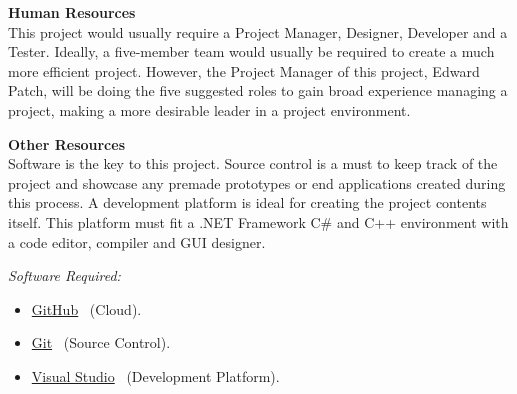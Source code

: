 \documentclass[conference]{IEEEtran}
\begin{document}
        \textbf{Human Resources}\\
          This project would usually require a Project Manager, Designer, Developer and a Tester. Ideally, a five-member team would usually be required to create a much more efficient project. However, the Project Manager of this project, Edward Patch, will be doing the five suggested roles to gain broad experience managing a project, making a more desirable leader in a project environment. 

        \textbf{Other Resources}\\
        Software is the key to this project. Source control is a must to keep track of the project and showcase any premade prototypes or end applications created during this process. A development platform is ideal for creating the project contents itself. This platform must fit a .NET Framework C\# and C++ environment with a code editor, compiler and GUI designer. 

        \textit{Software Required:}
        \begin{itemize}
          \item \href{https://github.com/}{GitHub}~\cite{github_github_nodate} (Cloud).
          \item \href{https://git-scm.com/}{Git}~\cite{git_git_nodate} (Source Control).
          \item \href{https://visualstudio.microsoft.com/}{Visual Studio}~\cite{microsoft_visual_nodate} (Development Platform).
        \end{itemize}
\end{document}
